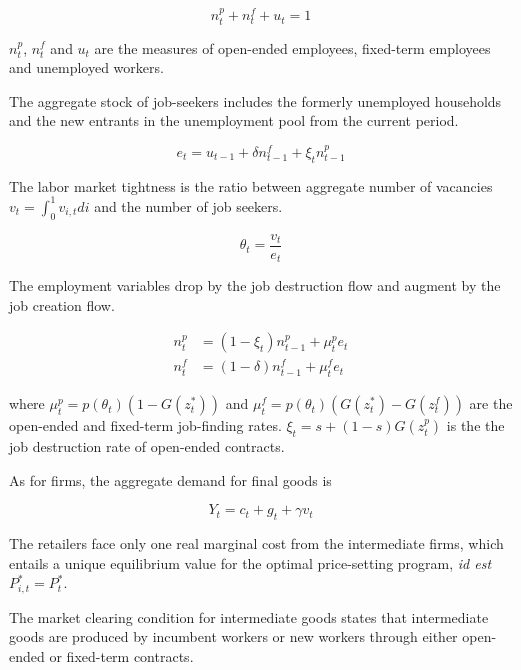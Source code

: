 \begin{equation}
n_t^p + n_t^f + u_t = 1
\end{equation}

$n_t^p$, $n_t^f$ and $u_t$ are the measures of open-ended employees, fixed-term employees and unemployed workers.

The aggregate stock of job-seekers includes the formerly unemployed households and the new entrants in the unemployment pool from the current period.

\begin{equation}
e_t = u_{t-1} + \delta n_{t-1}^f + \xi_t n_{t-1}^p
\end{equation}

The labor market tightness is the ratio between aggregate number of vacancies $v_t = \int_{0}^{1} v_{i,t} di$ and the number of job seekers.

\begin{equation*}
\theta_t = \frac{v_t}{e_t}
\end{equation*}

The employment variables drop by the job destruction flow and augment by the job creation flow.

\begin{align}
n_t^p &= \left( 1 - \xi_t \right) n_{t-1}^p + \mu_t^p e_t\\
n_t^f &= \left( 1 - \delta \right) n_{t-1}^f + \mu_t^f e_t
\end{align}

where $\mu_t^p = p\left( \theta_t \right) \left( 1- G\left( z_t^*\right)\right)$ and $\mu_t^f = p\left( \theta_t \right) \left( G\left( z_t^*\right)-G\left( z_t^f \right)\right)$ are the open-ended and fixed-term job-finding rates. $\xi_t = s + (1-s) G\left( z_t^p \right)$ is the the job destruction rate of open-ended contracts.

As for firms, the aggregate demand for final goods is

\begin{equation}
Y_t = c_t + g_t + \gamma v_t \label{eq:res_cons}
\end{equation}

The retailers face only one real marginal cost from the intermediate firms, which entails a unique equilibrium value for the optimal price-setting program, \emph{id est} $P_{i,t}^* = P_t^*$.

The market clearing condition for intermediate goods states that intermediate goods are produced by incumbent workers or new workers through either open-ended or fixed-term contracts. 

